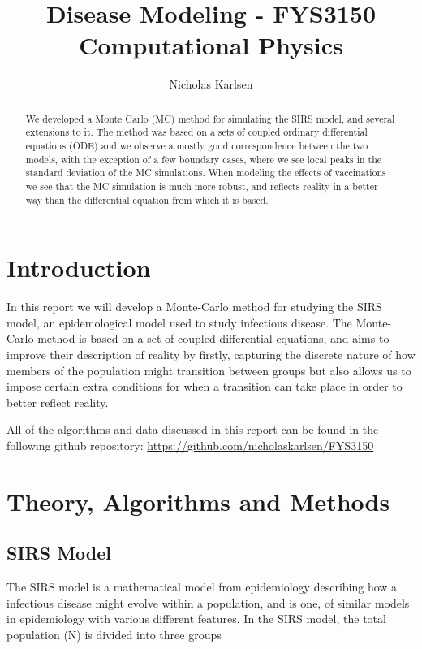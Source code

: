 \documentclass[10pt,showpacs,preprintnumbers,amsmath,amssymb,nofootinbib,aps,prl,twocolumn,groupedaddress,superscriptaddress,showkeys]{revtex4-1}
\begin{document}
\title{Disease Modeling - FYS3150 Computational Physics}
\author{Nicholas Karlsen}


\begin{abstract}
  We developed a Monte Carlo (MC) method for simulating the SIRS model, and several extensions to it. The method was based on a sets of coupled ordinary differential equations (ODE) and we observe a mostly good correspondence between the two models, with the exception of a few boundary cases, where we see local peaks in the standard deviation of the MC simulations. When modeling the effects of vaccinations we see that the MC simulation is much more robust, and reflects reality in a better way than the differential equation from which it is based.
\end{abstract}

\maketitle


\section{Introduction}
  In this report we will develop a Monte-Carlo method for studying the SIRS model, an epidemological model used to study infectious disease. The Monte-Carlo method is based on a set of coupled differential equations, and aims to improve their description of reality by firstly, capturing the discrete nature of how members of the population might transition between groups but also allows us to impose certain extra conditions for when a transition can take place in order to better reflect reality. 

  All of the algorithms and data discussed in this report can be found in the following github repository: \url{https://github.com/nicholaskarlsen/FYS3150}

\section{Theory, Algorithms and Methods}
  \subsection{SIRS Model}

    The SIRS model is a mathematical model from epidemiology describing how a infectious disease might evolve within a population, and is one, of similar models in epidemiology with various different features. In the SIRS model, the total population (N) is divided into three groups
\end{document}
